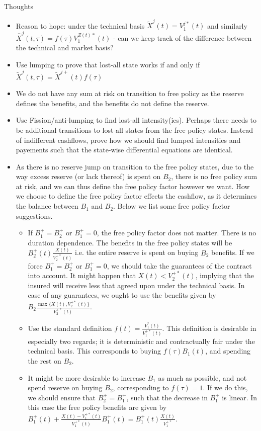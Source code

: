 \documentclass[12pt]{article}
\begin{document}
\fi
Thoughts
\begin{itemize}
\item Reason to hope: under the technical basis $\tilde{X}^j(t)=V_1^{j*}(t)$ and similarly $\hat{X}^j(t,\tau)=f(\tau)V_1^{Z(t)*}(t)$ - can we keep track of the difference between the technical and market basis?
\item Use lumping to prove that lost-all state works if and only if $\tilde{X}^j(t,\tau)= \tilde{X}^{j+}(t)f(\tau)$
\item We do not have any sum at risk on transition to free policy as the reserve defines the benefits, and the benefits do not define the reserve.
\item Use Fission/anti-lumping to find lost-all intensity(ies). Perhaps there needs to be additional transitions to lost-all states from the free policy states. Instead of indifferent cashflows, prove how we should find lumped intensities and payements such that the state-wise differential equations are identical.
\item As there is no reserve jump on transition to the free policy states, due to the way excess reserve (or lack thereof) is spent on $B_2$, there is no free policy sum at risk, and we can thus define the free policy factor however we want. How we choose to define the free policy factor effects the cashflow, as it determines the balance between $B_1$ and $B_2$. Below we list some free policy factor suggestions.
\begin{itemize}
\item If $B_1^+=B_2^+$ or $B_1^+=0$, the free policy factor does not matter. There is no duration dependence. The benefits in the free policy states will be $B_2^+(t)\frac{X(t)}{V_2^{+*}(t)}$ i.e. the entire reserve is spent on buying $B_2$ benefits. If we force $B_1^+=B_2^+$ or $B_1^+=0$, we should take the guarantees of the contract into account. It might happen that $X(t)<V_2^{+*}(t)$, implying that the insured will receive less that agreed upon under the technical basis. In case of any guarantees, we ought to use the benefits given by $B_2\frac{\max \{ X(t),V_2^{+*}(t)\}}{V_2^{+*}(t)}$.
\item Use the standard definition $f(t)=\frac{V_1^*(t)}{V_1^{+*}(t)}$. This definition is desirable in especially two regards; it is deterministic and contractually fair under the technical basis. This corresponds to buying $f(\tau)B_1(t)$, and spending the rest on $B_2$.
\item It might be more desirable to increase $B_1$ as much as possible, and not spend reserve on buying $B_2$, corresponding to $f(\tau)=1$. If we do this, we should ensure that $B_2^+=B_1^+$, such that the decrease in $B_1^+$ is linear. In this case the free policy benefits are given by $B_1^+(t)+\frac{X(t)-V_1^{+*}(t)}{V_1^{+*}(t)}B_1^+(t)=B_1^+(t)\frac{X(t)}{V_1^{+*}}$. 

\end{itemize}
\end{itemize}
\end{document}
